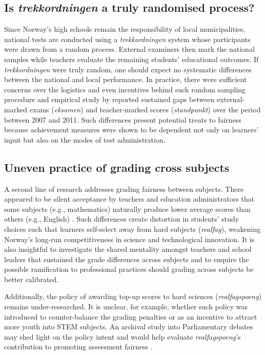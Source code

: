 \documentclass[
    a4paper,            %
    12pt,               %
    stu,                %
    donotrepeattitle,   %
    noextraspace,       %
    floatsintext,       %
    biblatex,           %
    colorlinks=true,        %
    linkcolor=red,          %
    anchorcolor=black,      %
    citecolor=blue,         %
    urlcolor=blue,          %
    bookmarks=true,         %
    bookmarksopen=false,    %
    bookmarksnumbered=true  %
]{apa7}
\begin{document}
\subsection{Is \textit{trekkordningen} a truly randomised process?}

Since Norway's high schools remain the responsibility of local municipalities, national tests are conducted using a \textit{trekkordningen} system whose participants were drawn from a random process. External examiners then mark the national samples while teachers evaluate the remaining students' educational outcomes. If \textit{trekkordningen} were truly random, one should expect no systematic differences between the national and local performance. In practice, there were sufficient concerns over the logistics and even incentives behind such random sampling procedure \parencite{olson:2021} and empirical study by \textcite{hovdhaugen:2018} reported sustained gaps between external-marked exams (\textit{eksamen}) and teacher-marked scores (\textit{standpunkt}) over the period between 2007 and 2011. Such differences present potential treats to fairness because achievement measures were shown to be dependent not only on learners' input but also on the modes of test administration.

\subsection{Uneven practice of grading cross subjects}

A second line of research addresses grading fairness between subjects. There appeared to be silent acceptance by teachers and education administrators that some subjects (e.g., mathematics) naturally produce lower average scores than others (e.g., English) \parencite{olson:2021}. Such differences create distortion in students' study choices such that learners self-select away from hard subjects (\textit{realfag}), weakening Norway's long-run competitiveness in science and technological innovation. It is also insightful to investigate the shared mentality amongst teachers and school leaders that sustained the grade differences across subjects and to enquire the possible ramification to professional practices should grading across subjects be better calibrated.

Additionally, the policy of awarding top-up scores to hard sciences (\textit{realfagspoeng}) remains under-researched. It is unclear, for example, whether such policy was introduced to counter-balance the grading penalties or as an incentive to attract more youth into STEM subjects. An archival study into Parliamentary debates may shed light on the policy intent and would help evaluate \textit{realfagspoeng}'s contribution to promoting assessment fairness \parencite{olson:2021}.
\end{document}

